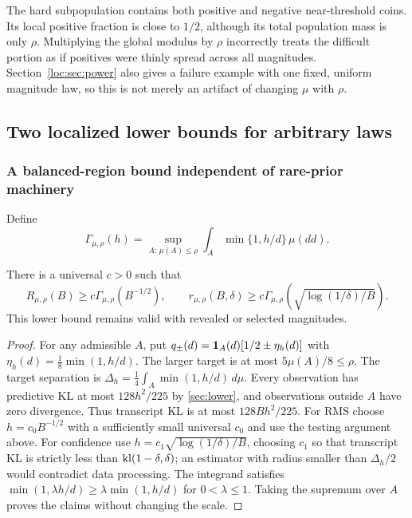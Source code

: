 The hard subpopulation contains both positive and negative near-threshold coins. Its local positive fraction is close to $1/2$, although its total population mass is only $\rho$. Multiplying the global modulus by $\rho$ incorrectly treats the difficult portion as if positives were thinly spread across all magnitudes. Section~\ref{loc:sec:power} also gives a failure example with one fixed, uniform magnitude law, so this is not merely an artifact of changing $\mu$ with $\rho$.

\subsection{Two localized lower bounds for arbitrary laws}
\subsubsection{A balanced-region bound independent of rare-prior machinery}
Define
\begin{equation}\label{loc:eq:Gamma}
 \Gamma_{\mu,\rho}(h)=
 \sup_{A:\,\mu(A)\le\rho}\int_A\min\{1,h/d\}\,\mu(dd).
\end{equation}
\begin{proposition}\label{loc:prop:Gamma}
There is a universal $c>0$ such that
\[
 R_{\mu,\rho}(B)\ge c\Gamma_{\mu,\rho}(B^{-1/2}),\qquad
 r_{\mu,\rho}(B,\delta)\ge c\Gamma_{\mu,\rho}\left(\sqrt{\log(1/\delta)/B}\right).
\]
This lower bound remains valid with revealed or selected magnitudes.
\end{proposition}
\begin{proof}
For any admissible $A$, put
$q_\pm(d)=\mathbf 1_A(d)[1/2\pm\eta_h(d)]$ with
$\eta_h(d)=\frac18\min(1,h/d)$. The larger target is at most $5\mu(A)/8\le\rho$. The target separation is
$\Delta_h=\frac14\int_A\min(1,h/d)\,d\mu$.
Every observation has predictive KL at most $128h^2/225$ by \cref{sec:lower}, and observations outside $A$ have zero divergence. Thus transcript KL is at most $128Bh^2/225$.
For RMS choose $h=c_0B^{-1/2}$ with a sufficiently small universal $c_0$ and use the testing argument above. For confidence use $h=c_1\sqrt{\log(1/\delta)/B}$, choosing $c_1$ so that transcript KL is strictly less than $\operatorname{kl}(1-\delta,\delta)$; an estimator with radius smaller than $\Delta_h/2$ would contradict data processing. The integrand satisfies $\min(1,\lambda h/d)\ge\lambda\min(1,h/d)$ for $0<\lambda\le1$. Taking the supremum over $A$ proves the claims without changing the scale.
\end{proof}

